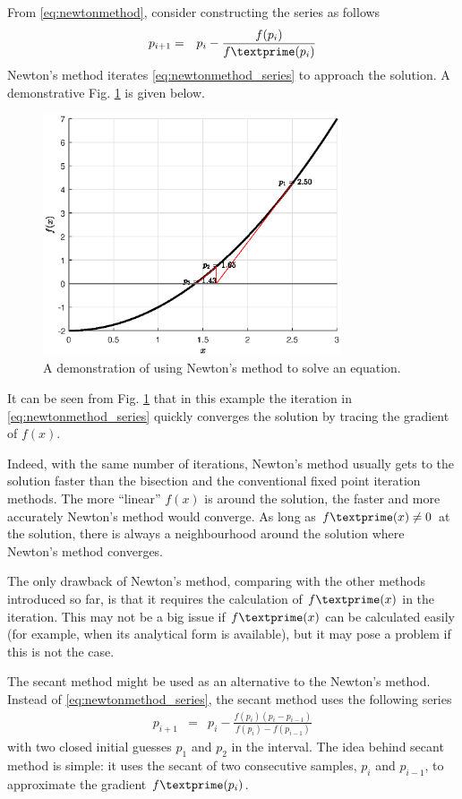 From \eqref{eq:newtonmethod}, consider constructing the series as follows
\begin{eqnarray}
  p_{i+1} &=& p_i - \frac{f(p_i)}{f\textprime(p_i)} \label{eq:newtonmethod_series}
\end{eqnarray}
Newton's method iterates \eqref{eq:newtonmethod_series} to approach the solution. A demonstrative Fig. \ref{fig:part-5:newton} is given below.
\begin{figure}[!htbp]
\centering
\includegraphics[width=250pt]{chapters/part-5/figures/demo_newton.eps}
\caption{A demonstration of using Newton's method to solve an equation.} \label{fig:part-5:newton}
\end{figure}
It can be seen from Fig. \ref{fig:part-5:newton} that in this example the iteration in \eqref{eq:newtonmethod_series} quickly converges the solution by tracing the gradient of $f(x)$. 

Indeed, with the same number of iterations, Newton's method usually gets to the solution faster than the bisection and the conventional fixed point iteration methods. The more ``linear'' $f(x)$ is around the solution, the faster and more accurately Newton's method would converge. As long as $f\textprime(x)\neq 0$ at the solution, there is always a neighbourhood around the solution where Newton's method converges. 

The only drawback of Newton's method, comparing with the other methods introduced so far, is that it requires the calculation of $f\textprime(x)$ in the iteration. This may not be a big issue if $f\textprime(x)$ can be calculated easily (for example, when its analytical form is available), but it may pose a problem if this is not the case.

The secant method might be used as an alternative to the Newton's method. Instead of \eqref{eq:newtonmethod_series}, the secant method uses the following series
\begin{eqnarray}
  p_{i+1} &=& p_i - \frac{f(p_i)(p_i-p_{i-1})}{f(p_i)-f(p_{i-1})} \nonumber
\end{eqnarray}
with two closed initial guesses $p_1$ and $p_2$ in the interval. The idea behind secant method is simple: it uses the secant of two consecutive samples, $p_i$ and $p_{i-1}$, to approximate the gradient $f\textprime(p_i)$.

